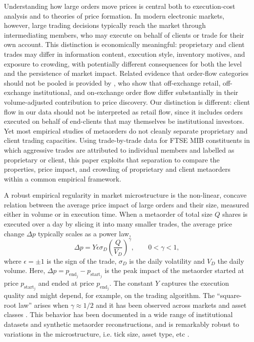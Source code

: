 \documentclass[11pt]{article}
\begin{document}
Understanding how large orders move prices is central both to execution-cost analysis and to theories
of price formation. In modern electronic markets, however, large trading decisions typically reach
the market through intermediating members, who may execute on behalf of clients or trade for
their own account. This distinction is economically meaningful: proprietary and client trades may
differ in information content, execution style, inventory motives, and exposure to crowding, with
potentially different consequences for both the level and the persistence of market impact. Related
evidence that order-flow categories should not be pooled is provided by
\cite{ChakrabartyCoxUpson2024RetailOrderFlow}, who show that off-exchange retail,
off-exchange institutional, and on-exchange order flow differ substantially in their
volume-adjusted contribution to price discovery. Our distinction is different: client flow in our
data should not be interpreted as retail flow, since it includes orders executed on behalf of
end-clients that may themselves be institutional investors. Yet most empirical studies of
metaorders do not cleanly separate proprietary and client trading capacities. Using trade-by-trade
data for FTSE MIB constituents in which aggressive trades are attributed to individual members
and labelled as proprietary or client, this paper exploits that separation to compare the properties,
price impact, and crowding of proprietary and client metaorders within a common empirical
framework.


A robust empirical regularity in market microstructure is the
non-linear, concave relation between the average price impact of large
orders and their size, measured either in volume or in execution time. When a metaorder of total size $Q$ shares is executed
over a day by slicing it into many smaller trades, the average price
change $\Delta p$ typically scales as a power law,
\begin{equation}
  \Delta p =Y \epsilon \sigma_D \left(\frac{Q}{V_D}\right)^\gamma, \qquad 0 < \gamma < 1,
\end{equation}
where $\epsilon=\pm  1$ is the sign of the trade, $\sigma_D$ is the daily volatility and $V_D$ the daily volume. 
Here, $\Delta p = p_{\mathrm{end}_j}-p_{\mathrm{start}_j}$ is the peak impact of the metaorder started at price $p_{\mathrm{start}_j}$ and ended at price $p_{\mathrm{end}_j}$. 
The constant $Y$ captures the execution quality and might depend, for example, on the trading algorithm. The ``square-root law'' arises when $\gamma \approx 1/2$ and it has been observed across markets and asset classes .
This behavior has been documented in a wide range of institutional
datasets and synthetic metaorder reconstructions, and is remarkably
robust to variations in the microstructure, i.e. tick size, asset type, etc \cite{BacryEtAl2014, Torre1997, AlmgrenEtAl2005, EngleEtAl2008, MastromatteoEtAl2014, BrokmannEtAl2014, SatoKanazawa2024}.
\end{document}
